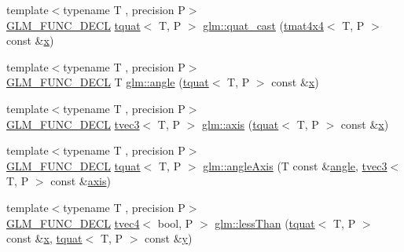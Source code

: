 \begin{DoxyCompactItemize}
\item 
{\footnotesize template$<$typename T , precision P$>$ }\\\mbox{\hyperlink{setup_8hpp_ab2d052de21a70539923e9bcbf6e83a51}{G\+L\+M\+\_\+\+F\+U\+N\+C\+\_\+\+D\+E\+CL}} \mbox{\hyperlink{structglm_1_1tquat}{tquat}}$<$ T, P $>$ \mbox{\hyperlink{group__gtc__quaternion_ga3e4615e9884dd0f41f5617b9848a5d9c}{glm\+::quat\+\_\+cast}} (\mbox{\hyperlink{structglm_1_1tmat4x4}{tmat4x4}}$<$ T, P $>$ const \&\mbox{\hyperlink{glad_8h_a92d0386e5c19fb81ea88c9f99644ab1d}{x}})
\item 
{\footnotesize template$<$typename T , precision P$>$ }\\\mbox{\hyperlink{setup_8hpp_ab2d052de21a70539923e9bcbf6e83a51}{G\+L\+M\+\_\+\+F\+U\+N\+C\+\_\+\+D\+E\+CL}} T \mbox{\hyperlink{group__gtc__quaternion_gad4a4448baedb198b2b1e7880d2544dc9}{glm\+::angle}} (\mbox{\hyperlink{structglm_1_1tquat}{tquat}}$<$ T, P $>$ const \&\mbox{\hyperlink{glad_8h_a92d0386e5c19fb81ea88c9f99644ab1d}{x}})
\item 
{\footnotesize template$<$typename T , precision P$>$ }\\\mbox{\hyperlink{setup_8hpp_ab2d052de21a70539923e9bcbf6e83a51}{G\+L\+M\+\_\+\+F\+U\+N\+C\+\_\+\+D\+E\+CL}} \mbox{\hyperlink{structglm_1_1tvec3}{tvec3}}$<$ T, P $>$ \mbox{\hyperlink{group__gtc__quaternion_ga0b3e87a13b2708154b72259e50789a19}{glm\+::axis}} (\mbox{\hyperlink{structglm_1_1tquat}{tquat}}$<$ T, P $>$ const \&\mbox{\hyperlink{glad_8h_a92d0386e5c19fb81ea88c9f99644ab1d}{x}})
\item 
{\footnotesize template$<$typename T , precision P$>$ }\\\mbox{\hyperlink{setup_8hpp_ab2d052de21a70539923e9bcbf6e83a51}{G\+L\+M\+\_\+\+F\+U\+N\+C\+\_\+\+D\+E\+CL}} \mbox{\hyperlink{structglm_1_1tquat}{tquat}}$<$ T, P $>$ \mbox{\hyperlink{group__gtc__quaternion_ga37ae19405f1ccf766f27e4fcd035d859}{glm\+::angle\+Axis}} (T const \&\mbox{\hyperlink{group__gtc__quaternion_gad4a4448baedb198b2b1e7880d2544dc9}{angle}}, \mbox{\hyperlink{structglm_1_1tvec3}{tvec3}}$<$ T, P $>$ const \&\mbox{\hyperlink{group__gtc__quaternion_ga0b3e87a13b2708154b72259e50789a19}{axis}})
\item 
{\footnotesize template$<$typename T , precision P$>$ }\\\mbox{\hyperlink{setup_8hpp_ab2d052de21a70539923e9bcbf6e83a51}{G\+L\+M\+\_\+\+F\+U\+N\+C\+\_\+\+D\+E\+CL}} \mbox{\hyperlink{structglm_1_1tvec4}{tvec4}}$<$ bool, P $>$ \mbox{\hyperlink{group__gtc__quaternion_ga91a40d16a3b5bb47d71ac1a3fb688ffa}{glm\+::less\+Than}} (\mbox{\hyperlink{structglm_1_1tquat}{tquat}}$<$ T, P $>$ const \&\mbox{\hyperlink{glad_8h_a92d0386e5c19fb81ea88c9f99644ab1d}{x}}, \mbox{\hyperlink{structglm_1_1tquat}{tquat}}$<$ T, P $>$ const \&\mbox{\hyperlink{glad_8h_a66ddd433d2cacfe27f5906b7e86faeed}{y}})

\end{DoxyCompactItemize}
